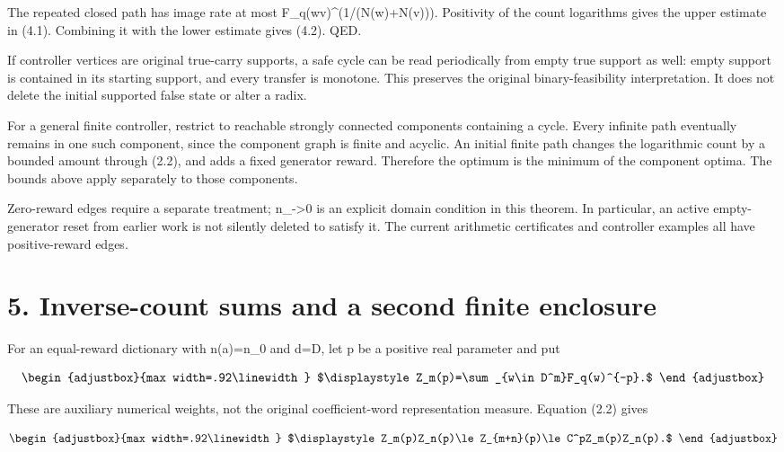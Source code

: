 The repeated closed path has image rate at most F\_q(wv)\^{}(1/(N(w)+N(v))). Positivity of the count logarithms gives the upper estimate in (4.1). Combining it with the lower estimate gives (4.2). QED.

If controller vertices are original true-carry supports, a safe cycle can be read periodically from empty true support as well: empty support is contained in its starting support, and every transfer is monotone. This preserves the original binary-feasibility interpretation. It does not delete the initial supported false state or alter a radix.

For a general finite controller, restrict to reachable strongly connected components containing a cycle. Every infinite path eventually remains in one such component, since the component graph is finite and acyclic. An initial finite path changes the logarithmic count by a bounded amount through (2.2), and adds a fixed generator reward. Therefore the optimum is the minimum of the component optima. The bounds above apply separately to those components.

Zero-reward edges require a separate treatment; n\_-\textgreater0 is an explicit domain condition in this theorem. In particular, an active empty-generator reset from earlier work is not silently deleted to satisfy it. The current arithmetic certificates and controller examples all have positive-reward edges.

\section{5. Inverse-count sums and a second finite enclosure}\label{n28-inverse-count-sums-and-a-second-finite-enclosure}

For an equal-reward dictionary with n(a)=n\_0 and d=\textbar D\textbar, let p be a positive real parameter and put

\[
\begin{adjustbox}{max width=.92\linewidth}
$\displaystyle Z_m(p)=\sum_{w\in D^m}F_q(w)^{-p}.$
\end{adjustbox}
\]

These are auxiliary numerical weights, not the original coefficient-word representation measure. Equation (2.2) gives

\[
\begin{adjustbox}{max width=.92\linewidth}
$\displaystyle Z_m(p)Z_n(p)\le Z_{m+n}(p)\le C^pZ_m(p)Z_n(p).$
\end{adjustbox}
\]

